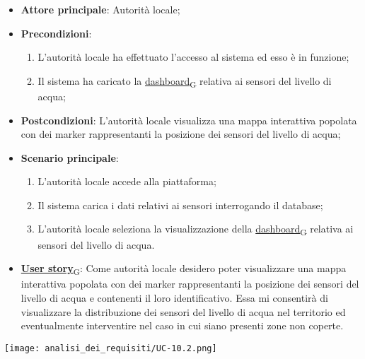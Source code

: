 \begin{itemize}
	\item \textbf{Attore principale}: Autorità locale;
	\item \textbf{Precondizioni}:
	      \begin{enumerate}
		      \item L'autorità locale ha effettuato l'accesso al sistema ed esso è in funzione;
		      \item Il sistema ha caricato la \href{https://7last.github.io/docs/rtb/documentazione-interna/glossario\#dashboard}{dashboard\textsubscript{G}} relativa ai sensori del livello di acqua;
	      \end{enumerate}
	\item \textbf{Postcondizioni}: L'autorità locale visualizza una mappa interattiva popolata con dei marker rappresentanti la posizione dei sensori del livello di acqua;
	\item \textbf{Scenario principale}:
	      \begin{enumerate}
		      \item L'autorità locale accede alla piattaforma;
		      \item Il sistema carica i dati relativi ai sensori interrogando il database;
		      \item L'autorità locale seleziona la visualizzazione della \href{https://7last.github.io/docs/rtb/documentazione-interna/glossario\#dashboard}{dashboard\textsubscript{G}} relativa ai sensori del livello di acqua.
	      \end{enumerate}
	\item \href{https://7last.github.io/docs/rtb/documentazione-interna/glossario\#user-story}{\textbf{User story}\textsubscript{G}}:
	      Come autorità locale desidero poter visualizzare una mappa interattiva popolata con dei marker rappresentanti la posizione dei sensori del livello di acqua
	      e contenenti il loro identificativo. Essa mi consentirà di visualizzare la distribuzione dei sensori del livello di acqua nel territorio ed eventualmente interventire nel caso in cui siano presenti zone non coperte.
\end{itemize}
\begin{center}
	\texttt{[image: analisi\_dei\_requisiti/UC-10.2.png]}
\end{center}

